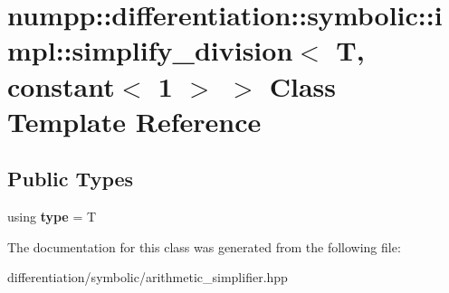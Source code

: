\hypertarget{classnumpp_1_1differentiation_1_1symbolic_1_1impl_1_1simplify__division_3_01T_00_01constant_3_011_01_4_01_4}{}\section{numpp\+:\+:differentiation\+:\+:symbolic\+:\+:impl\+:\+:simplify\+\_\+division$<$ T, constant$<$ 1 $>$ $>$ Class Template Reference}
\label{classnumpp_1_1differentiation_1_1symbolic_1_1impl_1_1simplify__division_3_01T_00_01constant_3_011_01_4_01_4}
\subsection*{Public Types}
\begin{DoxyCompactItemize}
\item 
\mbox{\label{classnumpp_1_1differentiation_1_1symbolic_1_1impl_1_1simplify__division_3_01T_00_01constant_3_011_01_4_01_4_aba406c7b0cedff7a74568f8e6b87c821}} 
using {\bfseries type} = T
\end{DoxyCompactItemize}


The documentation for this class was generated from the following file\+:\begin{DoxyCompactItemize}
\item 
differentiation/symbolic/arithmetic\+\_\+simplifier.\+hpp\end{DoxyCompactItemize}
